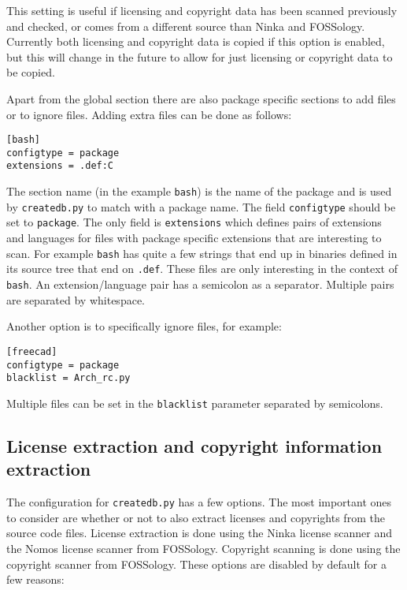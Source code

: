 \documentclass[10pt,a4paper]{article}
\begin{document}
This setting is useful if licensing and copyright data has been scanned
previously and checked, or comes from a different source than Ninka and
FOSSology. Currently both licensing and copyright data is copied if this option
is enabled, but this will change in the future to allow for just licensing or
copyright data to be copied.

Apart from the global section there are also package specific sections to add
files or to ignore files. Adding extra files can be done as follows:

\begin{verbatim}
[bash]
configtype = package
extensions = .def:C
\end{verbatim}

The section name (in the example \texttt{bash}) is the name of the package and
is used by \texttt{createdb.py} to match with a package name. The field
\texttt{configtype} should be set to \texttt{package}. The only field is
\texttt{extensions} which defines pairs of extensions and languages for files
with package specific extensions that are interesting to scan. For example
\texttt{bash} has quite a few strings that end up in binaries defined in its
source tree that end on \texttt{.def}. These files are only interesting in the
context of \texttt{bash}. An extension/language pair has a semicolon as a
separator. Multiple pairs are separated by whitespace.

Another option is to specifically ignore files, for example:

\begin{verbatim}
[freecad]
configtype = package
blacklist = Arch_rc.py
\end{verbatim}

Multiple files can be set in the \texttt{blacklist} parameter separated by
semicolons.

\subsection{License extraction and copyright information extraction}

The configuration for \texttt{createdb.py} has a few options. The most important
ones to consider are whether or not to also extract licenses and copyrights from
the source code files.  License extraction is done using the Ninka license
scanner and the Nomos license scanner from FOSSology. Copyright scanning is done
using the copyright scanner from FOSSology. These options are disabled
by default for a few reasons:
\end{document}
